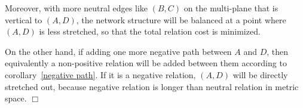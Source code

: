 Moreover, with more neutral edges like $(B,C)$ on the multi-plane that is vertical to $(A,D)$, the network structure will be balanced at a point where $(A,D)$ is less stretched, so that the total relation cost is minimized. 

On the other hand, if adding one more negative path between $A$ and $D$, then equivalently a non-positive relation will be added between them according to corollary~\ref{negative path}. If it is a negative relation, $(A,D)$ will be directly stretched out, because negative relation is longer than neutral relation in metric space. $\Box$